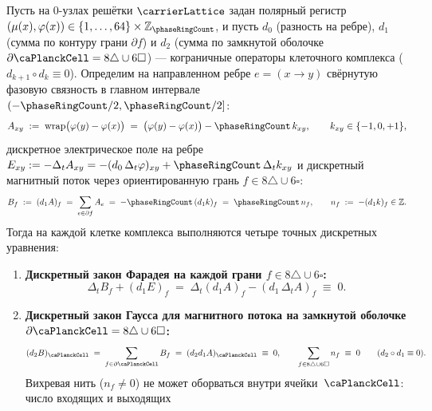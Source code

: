 \begin{theorem}
\label{thm:discrete-maxwell-sourceless}
Пусть на $0$-узлах решётки $\carrierLattice$ задан полярный регистр $(\mu(x),\varphi(x))\in\{1,\dots,64\}\times\mathbb{Z}_{\phaseRingCount}$,
и пусть $d_0$ (разность на ребре), $d_1$ (сумма по контуру грани $\partial f$) и $d_2$ (сумма по замкнутой
оболочке $\partial\PlanckCell = 8\triangle\cup 6\square$) --- кограничные операторы клеточного комплекса ($d_{k+1}\circ d_k \equiv 0$).
Определим на направленном ребре $e=(x\to y)$ свёрнутую фазовую связность в главном интервале $(-\phaseRingCount/2,\phaseRingCount/2]$:
\begin{equation}
\label{eq:discrete-edge-connection}
  A_{xy} \;:=\; \mathrm{wrap}\bigl(\varphi(y)-\varphi(x)\bigr)
  \;=\; \bigl(\varphi(y)-\varphi(x)\bigr) - \phaseRingCount\,k_{xy},
  \qquad
  k_{xy}\in\{-1,0,+1\},
\end{equation}
дискретное электрическое поле на ребре $E_{xy} := -\Delta_t A_{xy} = -(d_0\,\Delta_t\varphi)_{xy} + \phaseRingCount\,\Delta_t k_{xy}$
и дискретный магнитный поток через ориентированную грань $f\in 8\triangle\cup 6\square$:
\begin{equation}
\label{eq:discrete-plaquette-flux}
  B_f \;:=\; (d_1 A)_f \;=\; \sum_{e\in\partial f} A_e \;=\; -\phaseRingCount\,(d_1 k)_f \;=\; \phaseRingCount\,n_f,
  \qquad
  n_f \;:=\; -(d_1 k)_f \in \mathbb{Z}.
\end{equation}
Тогда на каждой клетке комплекса выполняются четыре точных дискретных уравнения:
\begin{enumerate}[label=(\roman*)]
\item \textbf{Дискретный закон Фарадея на каждой грани $f\in 8\triangle\cup 6\square$:}
  \begin{equation}
  \label{eq:discrete-faraday}
    \Delta_t B_f + (d_1 E)_f \;=\; \Delta_t(d_1 A)_f - (d_1\,\Delta_t A)_f \;\equiv\; 0.
  \end{equation}
\item \textbf{Дискретный закон Гаусса для магнитного потока на замкнутой оболочке $\partial\PlanckCell = 8\triangle\cup 6\square$:}
  \begin{equation}
  \label{eq:discrete-gauss-b}
    (d_2 B)_{\PlanckCell} \;=\; \sum_{f\in\partial\PlanckCell} B_f \;=\; (d_2 d_1 A)_{\PlanckCell} \;\equiv\; 0,
    \qquad
    \sum_{f\in 8\triangle\cup 6\square} n_f \;\equiv\; 0
    \qquad (d_2\circ d_1 \equiv 0).
  \end{equation}
  Вихревая нить ($n_f\ne 0$) не может оборваться внутри ячейки~$\PlanckCell$: число входящих и выходящих

\end{enumerate}
\end{theorem}
